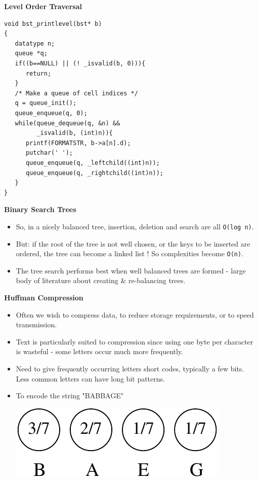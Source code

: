 {\newpage	
{\samepage	
\begin{center}	
{\Large{\bf Level Order Traversal}}	
\end{center}	
\begin{verbatim}	
void bst_printlevel(bst* b)	
{	
   datatype n;	
   queue *q;	
   if((b==NULL) || (! _isvalid(b, 0))){	
      return;	
   }	
   /* Make a queue of cell indices */	
   q = queue_init();	
   queue_enqueue(q, 0);	
   while(queue_dequeue(q, &n) &&	
         _isvalid(b, (int)n)){	
      printf(FORMATSTR, b->a[n].d);	
      putchar(' ');	
      queue_enqueue(q, _leftchild((int)n));	
      queue_enqueue(q, _rightchild((int)n));	
   }	
}	
\end{verbatim}	
}	

\newpage	
{\samepage	
\begin{center}	
{\Large{\bf Binary Search Trees}}	
\end{center}	
\begin{itemize}	
\item So, in a nicely balanced tree, insertion, deletion and search are all \verb^O(log n)^.
\item  But: if the root of the tree is not well chosen, or the keys to be inserted are ordered, the tree can become a linked list ! So complexities become \verb^O(n)^.	
\item The tree search performs best when well balanced trees are formed - large	
body of literature about creating \& re-balancing trees.	
\end{itemize}	
}	






\newpage	
{\samepage	
\begin{center}	
{\Large{\bf Huffman Compression}}	
\end{center}	
\begin{itemize}	
\item Often we wish to compress data, to reduce storage requirements, or to speed transmission.	
\item  Text is particularly suited to compression since using one byte per character is wasteful - some letters occur much more frequently.	
\item  Need to give frequently occurring letters short codes, typically a few bits. Less common letters can have long bit patterns.	
\item To encode the string "BABBAGE"	
\begin{center}	
\includegraphics{../Images/huff1.pdf}	
\end{center}	
\end{itemize}	
}	

}
